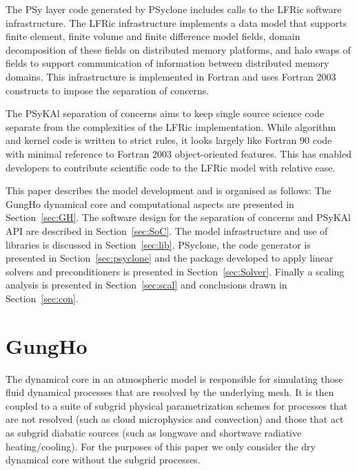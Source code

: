 \documentclass[review,times]{elsarticle}
\begin{document}
The PSy layer code generated by PSyclone includes calls to the LFRic
software infrastructure. The LFRic infrastructure implements a data
model that supports finite element, finite volume and finite
difference model fields, domain decomposition of these fields on
distributed memory platforms, and halo swaps of fields to support
communication of information between distributed memory domains. This
infrastructure is implemented in Fortran and uses Fortran 2003
constructs to impose the separation of concerns.

The PSyKAl separation of concerns aims to keep single source science
code separate from the complexities of the LFRic implementation. While
algorithm and kernel code is written to strict rules, it looks largely
like Fortran 90 code with minimal reference to Fortran 2003
object-oriented features. This has enabled developers to contribute
scientific code to the LFRic model with relative ease.

This paper describes the model development and is organised as follows:
The GungHo dynamical core and computational aspects are presented in
Section~\ref{sec:GH}. The software design for the separation of
concerns and PSyKAl API are described in
Section~\ref{sec:SoC}. The model infrastructure and use of libraries
is discussed in Section~\ref{sec:lib}. PSyclone, the code generator is
presented in Section~\ref{sec:psyclone} and the package developed to
apply linear solvers and preconditioners is presented in Section~\ref{sec:Solver}.
Finally a scaling analysis is presented in Section~\ref{sec:scal} and
conclusions drawn in Section~\ref{sec:con}.


\section{\label{sec:GH}GungHo}

The dynamical core in an atmospheric model is responsible for
simulating those fluid dynamical processes that are resolved by the
underlying mesh. It is then coupled to a suite of subgrid physical
parametrization schemes for processes that are not resolved (such as
cloud microphysics and convection) and those that act as subgrid
diabatic sources (such as longwave and shortwave radiative
heating/cooling). For the purposes of this paper we only consider
the dry dynamical core without the subgrid processes.
\end{document}
